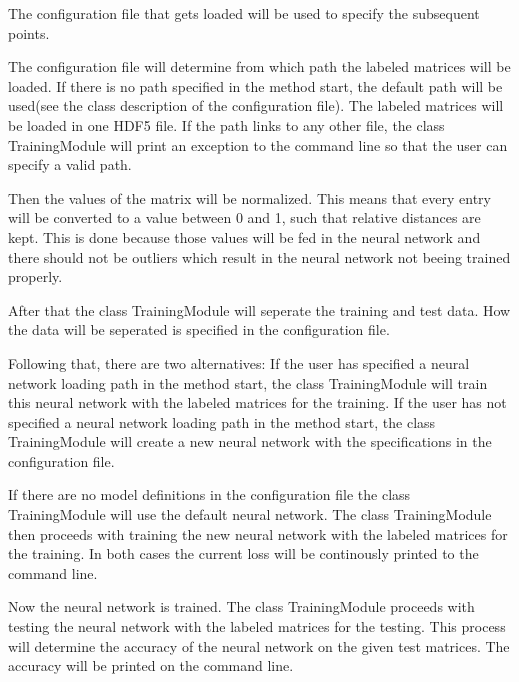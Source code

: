 \documentclass[parskip=full]{scrartcl}
\begin{document}
The configuration file that gets loaded will be used to specify the subsequent points.\newline

The configuration file will determine from which path the labeled matrices will be loaded.
If there is no path specified in the method start, the default path will be used(see the class description of the configuration file).
The labeled matrices will be loaded in one \gls{HDF5} file.
If the path links to any other file, the class TrainingModule will print an exception to the command line so that the user can specify a valid path. \newline

Then the values of the matrix will be normalized.
This means that every entry will be converted to a value between 0 and 1, such that relative distances are kept.
This is done because those values will be fed in the \gls{neural network} and there should not be outliers which result in the \gls{neural network} not beeing trained properly.

After that the class TrainingModule will seperate the training and test data.
How the data will be seperated is specified in the configuration file.\newline

Following that, there are two alternatives:
If the user has specified a \gls{neural network} loading path in the method start, the class TrainingModule will train this \gls{neural network} with the labeled matrices for the training.
If the user has not specified a \gls{neural network}  loading path in the method start, the class TrainingModule will create a new \gls{neural network} with the specifications in the configuration file.\newline

If there are no model definitions in the configuration file the class TrainingModule will use the \gls{default neural network}.
The class TrainingModule then proceeds with training the new \gls{neural network} with the labeled matrices for the training.
In both cases the current loss will be continously printed to the command line.\newline

Now the \gls{neural network} is trained. The class TrainingModule proceeds with testing the \gls{neural network} with the labeled matrices for the testing.
This process will determine the accuracy of the \gls{neural network} on the given test matrices.
The accuracy will be printed on the command line.\newline
\end{document}
